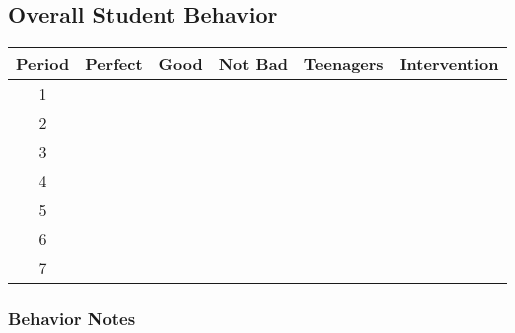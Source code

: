 \documentclass[10pt]{article}
\newcommand{\rulers}{\uline{\hfill\null }}
\begin{document}
\subsection*{Overall Student Behavior}
\begin{tabular}{|c|c|c|c|c|c|}
\hline 
\rule[-1ex]{0pt}{4.5ex} Period & Perfect & Good & Not Bad & Teenagers & Intervention \\ 
\hline 
\rule[-1ex]{0pt}{4.5ex} 1 &  &  &  &  &  \\ 
\hline 
\rule[-1ex]{0pt}{4.5ex} 2 &  &  &  &  &  \\ 
\hline 
\rule[-1ex]{0pt}{4.5ex} 3 &  &  &  &  &  \\ 
\hline 
\rule[-1ex]{0pt}{4.5ex} 4 &  &  &  &  &  \\ 
\hline 
\rule[-1ex]{0pt}{4.5ex} 5 &  &  &  &  &  \\ 
\hline 
\rule[-1ex]{0pt}{4.5ex} 6 &  &  &  &  &  \\ 
\hline 
\rule[-1ex]{0pt}{4.5ex} 7 &  &  &  &  &  \\ 
\hline 
\end{tabular} 
\vspace{.25in}

\begin{framed}
\subsubsection*{Behavior Notes}
\begin{description}
    \item \rulers
    \item \rulers
    \item \rulers
    \item \rulers
\end{description}
\vspace{0.2in}
\end{framed}
\end{document}
